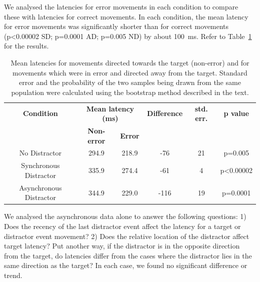 \documentclass[10pt,letterpaper]{article}
\begin{document}
We analysed the latencies for error movements in each condition to
compare these with latencies for correct movements. In each condition,
the mean latency for error movements was significantly shorter than
for correct movements (p\textless0.00002 SD; p=0.0001 AD; p=0.005 ND) by
about 100~ms. Refer to Table~\ref{table:latencies} for the results.

\begin{table}[ht]
\caption{Mean latencies for movements directed towards the target
  (non-error) and for movements which were in error and directed away
  from the target. Standard error and the probability of the two
  samples being drawn from the same population were calculated using
  the bootstrap method described in the text.}  \centering
\begin{tabular}{c c c c c c}
\hline
\textbf{Condition} & \multicolumn{2}{c}{\textbf{Mean latency (ms)}} & \textbf{Difference} & \textbf{std. err.} & \textbf{p value} \\ [0.5ex]
\multicolumn{1}{c}{~} & \textbf{Non-error} & \textbf{Error} & \multicolumn{3}{c}{~} \\
\hline
No Distractor           & 294.9 & 218.9 &  -76  & 21 & p=0.005\\
Synchronous Distractor  & 335.9 & 274.4 &  -61  & 4  & p\textless0.00002 \\
Asynchronous Distractor & 344.9 & 229.0 & -116  & 19 & p=0.0001 \\ [1ex]
\hline
\end{tabular}
\label{table:latencies}
\end{table}

We analysed the asynchronous data alone to answer the following
questions: 1) Does the recency of the last distractor event affect the
latency for a target or distractor event movement?  2) Does the
relative location of the distractor affect target latency? Put another
way, if the distractor is in the opposite direction from the target,
do latencies differ from the cases where the distractor lies in the
same direction as the target? In each case, we found no significant
difference or trend.
\end{document}
